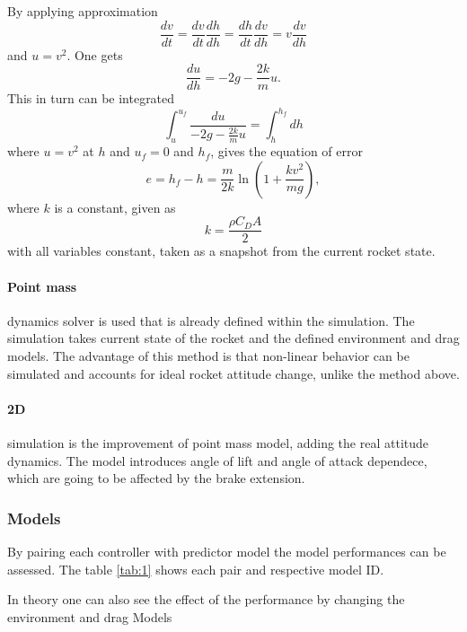 By applying approximation
\begin{equation}
    \frac{dv}{dt} = \frac{dv}{dt}\frac{dh}{dh} = \frac{dh}{dt}\frac{dv}{dh} = v \frac{dv}{dh}
\end{equation}
and $u = v^2$. One gets
\begin{equation}
    \frac{du}{dh} = -2g -\frac{2k}{m}u.
\end{equation}
This in turn can be integrated
\begin{equation}
    \int_{u}^{u_f} \frac{du}{-2g -\frac{2k}{m}u} = \int_{h}^{h_f}dh
\end{equation}
where $u = v^2$ at $h$ and $u_f = 0$ and $h_f$, gives the equation of error
\begin{equation}
    e = h_f - h = \frac{m}{2k}\ln\left(1 + \frac{k v^2}{mg}\right),
\end{equation}
where $k$ is a constant, given as
\begin{equation}
    k = \frac{\rho C_DA}{2}
\end{equation}
with all variables constant, taken as a snapshot from the current rocket state. 

\paragraph{Point mass} dynamics solver is used that is already defined within the simulation.
The simulation takes current state of the rocket and the defined environment and drag models.
The advantage of this method is that non-linear behavior can be simulated and accounts for
ideal rocket attitude change, unlike the method above.

\paragraph{2D} simulation is the improvement of point mass model, adding the real attitude dynamics.
The model introduces angle of lift and angle of attack dependece, which are going to be affected by
the brake extension.

\subsubsection{Models}
By pairing each controller with predictor model the model performances can be assessed. The table \ref{tab:1}
shows each pair and respective model ID.

\begin{table}[ht]
    \label{tab:1}
    \caption{Models made by pairing each controller with a predictor model.}
\end{table}

In theory one can also see the effect of the performance by changing the environment and drag Models
